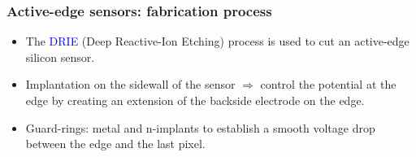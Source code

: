 \begin{frame}
  \frametitle{Active-edge sensors: fabrication process}

  \begin{itemize}
  \item The \textcolor{Blue}{DRIE} (Deep Reactive-Ion Etching) process
    is used to cut an active-edge silicon sensor.
  \item Implantation on the sidewall of the sensor $\Rightarrow$
    control the potential at the edge by creating an extension of the
    backside electrode on the edge.
  \item Guard-rings: metal and n-implants to establish a smooth
    voltage drop between the edge and the last pixel.
  \end{itemize}


    

  \begin{columns}


\end{columns}
\end{frame}
